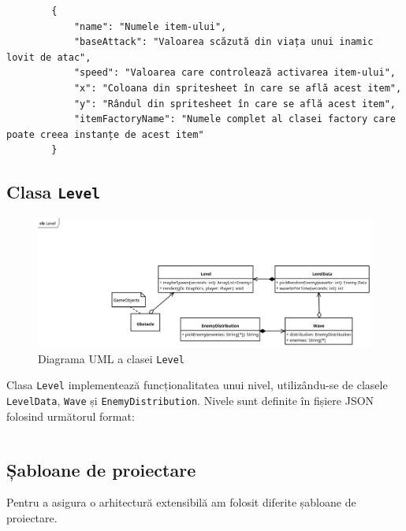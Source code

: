 \documentclass{article}
\begin{document}
    \label{sec:item-json}
    \begin{verbatim}
        {
            "name": "Numele item-ului",
            "baseAttack": "Valoarea scăzută din viața unui inamic lovit de atac",
            "speed": "Valoarea care controlează activarea item-ului",
            "x": "Coloana din spritesheet în care se află acest item",
            "y": "Rândul din spritesheet în care se află acest item",
            "itemFactoryName": "Numele complet al clasei factory care poate creea instanțe de acest item"
        }
    \end{verbatim}

    \subsection{Clasa \texttt{Level}}
    \begin{figure}[H]
        \includegraphics[width=\textwidth]{level-diagram}
        \centering
        \caption{Diagrama UML a clasei \texttt{Level}}
    \end{figure}

    Clasa \texttt{Level} implementează funcționalitatea unui nivel, utilizându-se de clasele
    \texttt{LevelData}, \texttt{Wave} și \texttt{EnemyDistribution}. Nivele sunt definite în fișiere
    JSON folosind următorul format:

    \inputminted[linenos, breaklines]{json}{example-level.json}

    \subsection{Șabloane de proiectare}

    Pentru a asigura o arhitectură extensibilă am folosit diferite șabloane de proiectare.
\end{document}
